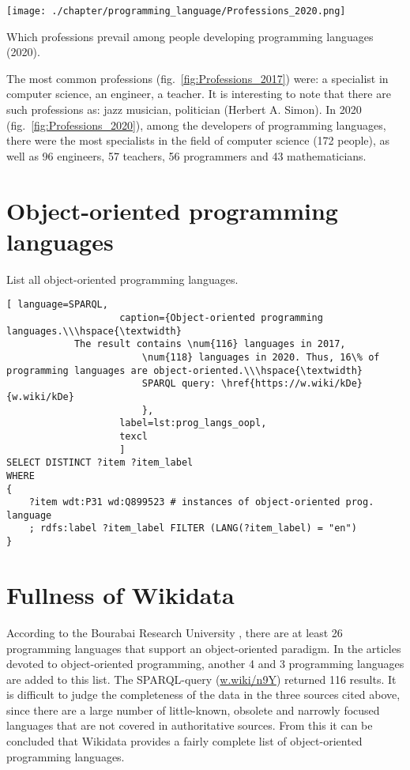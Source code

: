 \begin{marginfigure}
	\texttt{[image: ./chapter/programming\_language/Professions\_2020.png]}
	\caption{Which professions prevail among people developing programming languages (2020).}
	\label{fig:Professions_2020}
\end{marginfigure}

The most common professions (fig.~\ref{fig:Professions_2017}) were: a specialist in computer science, an engineer, a teacher. It is interesting to note that there are such professions as: jazz musician, politician (Herbert A. Simon). In 2020 (fig.~\ref{fig:Professions_2020}), among the developers of programming languages, there were the most specialists in the field of computer science (172 people), as well as 96 engineers, 57 teachers, 56 programmers and 43 mathematicians.

\section{Object-oriented programming languages}

List all object-oriented programming languages.

\begin{lstlisting}[ language=SPARQL, 
                    caption={Object-oriented programming languages.\\\hspace{\textwidth}
			The result contains \num{116} languages in 2017, 
                        \num{118} languages in 2020. Thus, 16\% of programming languages are object-oriented.\\\hspace{\textwidth}
                        SPARQL query: \href{https://w.wiki/kDe}{w.wiki/kDe}
                        },
                    label=lst:prog_langs_oopl,
                    texcl 
                    ]
SELECT DISTINCT ?item ?item_label
WHERE
{
    ?item wdt:P31 wd:Q899523 # instances of object-oriented prog. language
    ; rdfs:label ?item_label FILTER (LANG(?item_label) = "en") 
}
\end{lstlisting}%

\section{Fullness of Wikidata}

According to the Bourabai Research University \cite{oo_langs_bourabai}, there are at least 26 programming languages that support an object-oriented paradigm. In the articles devoted to object-oriented programming, another 4 \cite{oo_langs_science_wikia} and 3 \cite{oo_langs_garshin} programming languages are added to this list. The SPARQL-query (\href{https://w.wiki/n9Y}{w.wiki/n9Y}) returned 116 results. It is difficult to judge the completeness of the data in the three sources cited above, since there are a large number of little-known, obsolete and narrowly focused languages that are not covered in authoritative sources. From this it can be concluded that Wikidata provides a fairly complete list of object-oriented programming languages.


